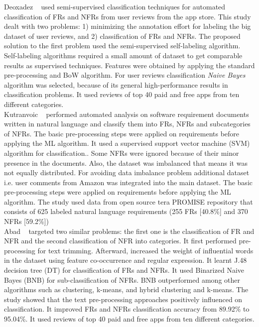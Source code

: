 Deoxadez \etal~\cite{Deocadez:2017} used semi-supervised classification
techniques for automated classification of FRs and NFRs from user reviews from
the app store. This study dealt with two problems: 1) minimizing the annotation
effort for labeling the big dataset of user reviews, and 2) classification of
FRs and NFRs. The proposed solution to the first problem used
the semi-supervised self-labeling algorithm. Self-labeling algorithms required a
small amount of dataset to get comparable results as supervised techniques. Features were obtained
by applying the standard pre-processing and BoW algorithm. For user reviews classification \emph{Naive Bayes}
algorithm was selected, because of its general high-performance results in classification
problems. It used reviews of top 40 paid and free apps from ten
different categories.\\

Kutranvoic \etal ~ \cite {Kurtanovic:2017} performed automated analysis on
software requirement documents written in natural language  and classify them into FRs,
NFRs and subcategories of NFRs. The basic pre-processing steps were applied on requirements before applying the ML algorithm. It used a supervised support vector machine (SVM) algorithm for classification.. Some NFRs were ignored because of their minor presence in the documents. Also, the dataset was imbalanced that means it was not equally distributed. For avoiding data imbalance problem additional dataset i.e. user comments
from Amazon was integrated into the main dataset. The basic pre-processing steps were applied on requirements before applying the ML algorithm. The study used data from open source tera PROMISE repository that consists of 625 labeled natural language requirements (255 FRs
[40.8\%] and 370 NFRs [59.2\%])\\

 Abad \etal ~ \cite{Abad:2017} targeted two similar problems: the first one is the classification of FR and NFR and the second classification of NFR into categories.
 It first performed pre-processing for text trimming. Afterward, increased the weight of influential words in the
dataset using feature co-occurrence and regular
expression. It learnt J.48 decision tree (DT) for classification of FRs and NFRs. It used  Binarized Naive Bayes (BNB) for sub-classification of NFRs. BNB outperformed among other algorithms such as clustering, k-means, and hybrid clustering and k-means. 
The study showed that the text pre-processing approaches positively influenced on classification. It improved FRs and NFRs
 classification accuracy from 89.92\% to 95.04\%. It used reviews of top 40 paid and free apps from ten
different categories.\\

